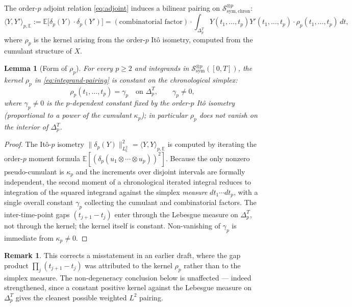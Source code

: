 \documentclass[11pt,reqno]{amsart}
\theoremstyle{plain}
\newtheorem{lemma}[theorem]{Lemma}
\theoremstyle{definition}
\newtheorem{remark}[theorem]{Remark}
\newcommand{\E}{\mathbb{E}}
\newcommand{\sym}{\mathrm{sym}}
\newcommand{\Schw}{\mathcal{S}}
\newcommand{\simplex}{\Delta_p^T}
\newcommand{\chron}{\mathrm{chron}}
\begin{document}
The order-$p$ adjoint relation \eqref{eq:adjoint} induces a bilinear pairing on $\Schw_{\sym, \chron}^{\otimes p}$:
\begin{equation}
\label{eq:integrand-pairing}
\langle Y, Y' \rangle_{p, \E} := \E\bigl[\delta_p(Y) \cdot \delta_p(Y')\bigr]
= (\text{combinatorial factor}) \cdot \int_{\simplex} Y(t_1, \ldots, t_p) Y'(t_1, \ldots, t_p) \cdot \rho_p(t_1, \ldots, t_p)\, dt,
\end{equation}
where $\rho_p$ is the kernel arising from the order-$p$ Itô isometry, computed from the cumulant structure of $X$.

\begin{lemma}[Form of $\rho_p$]
\label{lem:rho-p}
For every $p \geq 2$ and integrands in $\Schw_{\sym}^{\otimes p}([0,T])$, the kernel $\rho_p$ in \eqref{eq:integrand-pairing} is constant on the chronological simplex:
\begin{equation}
\rho_p(t_1, \ldots, t_p) = \gamma_p \quad\text{on } \simplex, \qquad \gamma_p \neq 0,
\end{equation}
where $\gamma_p \neq 0$ is the $p$-dependent constant fixed by the order-$p$ Itô isometry (proportional to a power of the cumulant $\kappa_p$); in particular $\rho_p$ does not vanish on the interior of $\simplex$.
\end{lemma}

\begin{proof}
The Itô-$p$ isometry $\|\delta_p(Y)\|_{L^2_\E}^2 = \langle Y, Y \rangle_{p, \E}$ is computed by iterating the order-$p$ moment formula $\E[(\delta_p(u_1 \otimes \cdots \otimes u_p))^2]$. Because the only nonzero pseudo-cumulant is $\kappa_p$ and the increments over disjoint intervals are formally independent, the second moment of a chronological iterated integral reduces to integration of the squared integrand against the simplex \emph{measure} $dt_1 \cdots dt_p$, with a single overall constant $\gamma_p$ collecting the cumulant and combinatorial factors. The inter-time-point gaps $(t_{j+1}-t_j)$ enter through the Lebesgue measure on $\simplex$, not through the kernel; the kernel itself is constant. Non-vanishing of $\gamma_p$ is immediate from $\kappa_p \neq 0$.
\end{proof}

\begin{remark}
This corrects a misstatement in an earlier draft, where the gap product $\prod_j (t_{j+1}-t_j)$ was attributed to the kernel $\rho_p$ rather than to the simplex measure. The non-degeneracy conclusion below is unaffected --- indeed strengthened, since a constant positive kernel against the Lebesgue measure on $\simplex$ gives the cleanest possible weighted $L^2$ pairing.
\end{remark}
\end{document}
